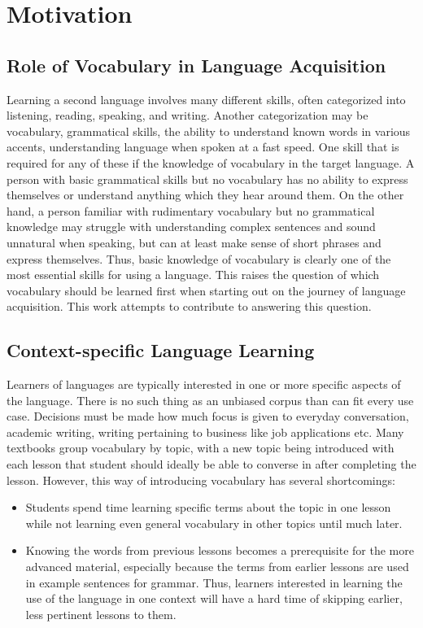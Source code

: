 \section{Motivation}
\subsection{Role of Vocabulary in Language Acquisition}
Learning a second language involves many different skills, often categorized into listening, reading, speaking, and writing.
Another categorization may be vocabulary, grammatical skills, the ability to understand known words in various accents, understanding language when spoken at a fast speed.
One skill that is required for any of these if the knowledge of vocabulary in the target language.
A person with basic grammatical skills but no vocabulary has no ability to express themselves or understand anything which they hear around them.
On the other hand, a person familiar with rudimentary vocabulary but no grammatical knowledge may struggle with understanding complex sentences and sound unnatural when speaking, but can at least make sense of short phrases and express themselves.
Thus, basic knowledge of vocabulary is clearly one of the most essential skills for using a language.
This raises the question of which vocabulary should be learned first when starting out on the journey of language acquisition.
This work attempts to contribute to answering this question.


\subsection{Context-specific Language Learning}
Learners of languages are typically interested in one or more specific aspects of the language.
There is no such thing as an unbiased corpus than can fit every use case.
Decisions must be made how much focus is given to everyday conversation, academic writing, writing pertaining to business like job applications etc.
Many textbooks group vocabulary by topic, with a new topic being introduced with each lesson that student should ideally be able to converse in after completing the lesson.
However, this way of introducing vocabulary has several shortcomings:
\begin{itemize}
	\item Students spend time learning specific terms about the topic in one lesson while not learning even general vocabulary in other topics until much later.
	\item Knowing the words from previous lessons becomes a prerequisite for the more advanced material, especially because the terms from earlier lessons are used in example sentences for grammar.
	      Thus, learners interested in learning the use of the language in one context will have a hard time of skipping earlier, less pertinent lessons to them.
\end{itemize}


